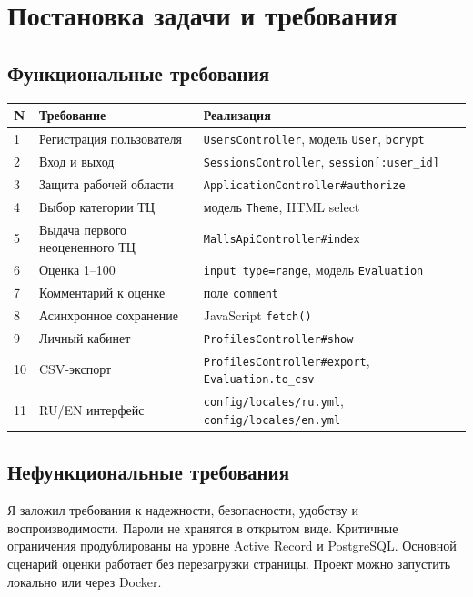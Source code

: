 \documentclass[14pt,a4paper]{extarticle}
\begin{document}
\section{Постановка задачи и требования}
\subsection{Функциональные требования}

\begin{longtable}{|p{7mm}|p{62mm}|p{70mm}|}
\hline
N & Требование & Реализация \\ \hline
1 & Регистрация пользователя & \texttt{UsersController}, модель \texttt{User}, \texttt{bcrypt} \\ \hline
2 & Вход и выход & \texttt{SessionsController}, \texttt{session[:user\_id]} \\ \hline
3 & Защита рабочей области & \texttt{ApplicationController\#authorize} \\ \hline
4 & Выбор категории ТЦ & модель \texttt{Theme}, HTML select \\ \hline
5 & Выдача первого неоцененного ТЦ & \texttt{MallsApiController\#index} \\ \hline
6 & Оценка 1--100 & \texttt{input type=range}, модель \texttt{Evaluation} \\ \hline
7 & Комментарий к оценке & поле \texttt{comment} \\ \hline
8 & Асинхронное сохранение & JavaScript \texttt{fetch()} \\ \hline
9 & Личный кабинет & \texttt{ProfilesController\#show} \\ \hline
10 & CSV-экспорт & \texttt{ProfilesController\#export}, \texttt{Evaluation.to\_csv} \\ \hline
11 & RU/EN интерфейс & \texttt{config/locales/ru.yml}, \texttt{config/locales/en.yml} \\ \hline
\end{longtable}

\subsection{Нефункциональные требования}

Я заложил требования к надежности, безопасности, удобству и воспроизводимости. Пароли не хранятся в открытом виде. Критичные ограничения продублированы на уровне Active Record и PostgreSQL. Основной сценарий оценки работает без перезагрузки страницы. Проект можно запустить локально или через Docker.
\end{document}
